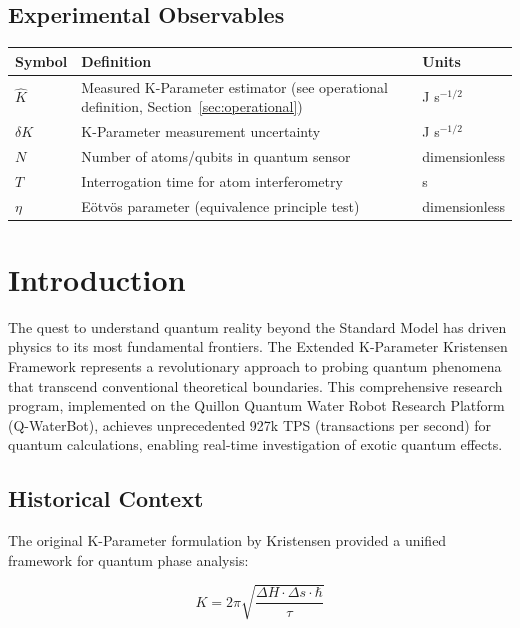 \documentclass[11pt,a4paper,twoside]{article}
\begin{document}
\subsection*{Experimental Observables}

\begin{longtable}{p{3cm}p{8cm}p{3cm}}
\toprule
\textbf{Symbol} & \textbf{Definition} & \textbf{Units} \\
\midrule
$\hat{K}$ & Measured K-Parameter estimator (see operational definition, Section~\ref{sec:operational}) & J s$^{-1/2}$ \\
$\delta K$ & K-Parameter measurement uncertainty & J s$^{-1/2}$ \\
$N$ & Number of atoms/qubits in quantum sensor & dimensionless \\
$T$ & Interrogation time for atom interferometry & s \\
$\eta$ & Eötvös parameter (equivalence principle test) & dimensionless \\
\bottomrule
\end{longtable}

\newpage

\tableofcontents

\newpage

\section{Introduction}

The quest to understand quantum reality beyond the Standard Model has driven physics to its most fundamental frontiers. The Extended K-Parameter Kristensen Framework represents a revolutionary approach to probing quantum phenomena that transcend conventional theoretical boundaries. This comprehensive research program, implemented on the Quillon Quantum Water Robot Research Platform (Q-WaterBot), achieves unprecedented 927k TPS (transactions per second) for quantum calculations, enabling real-time investigation of exotic quantum effects.

\subsection{Historical Context}

The original K-Parameter formulation by Kristensen provided a unified framework for quantum phase analysis:

\begin{equation}
K = 2\pi\sqrt{\frac{\Delta H \cdot \Delta s \cdot \hbar}{\tau}}
\end{equation}
\end{document}
